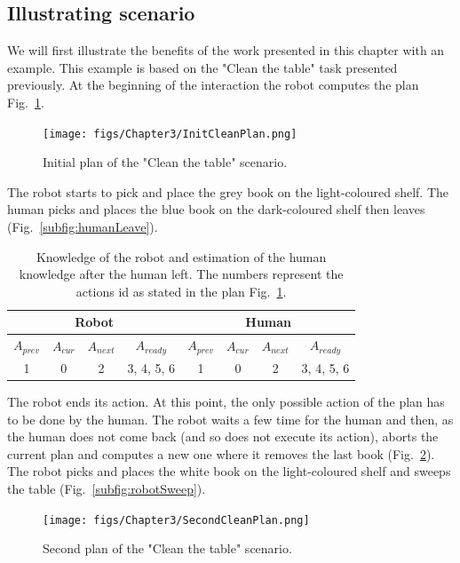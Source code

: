 \documentclass[english,a4paper,11pt,twoside]{StyleThese}
\begin{document}
\subsection{Illustrating scenario}

We will first illustrate the benefits of the work presented in this chapter with an example. This example is based on the "Clean the table" task presented previously. At the beginning of the interaction the robot computes the plan Fig.~\ref{fig:initPlanClean}. 

\begin{figure}[!h]
	\centering
    \texttt{[image: figs/Chapter3/InitCleanPlan.png]}
    \caption{Initial plan of the "Clean the table" scenario. }
    \label{fig:initPlanClean}
\end{figure}


The robot starts to pick and place the grey book on the light-coloured shelf. The human picks and places the blue book on the dark-coloured shelf then leaves (Fig.~\ref{subfig:humanLeave}).

\begin{table}[!h]
\begin{center}
\begin{tabular}{|c|c|c|c||c|c|c|c|}
\hline
\multicolumn{4}{|c||}{Robot} & \multicolumn{4}{c|}{Human}\\
\hline
$A_{prev}$ & $A_{cur}$ & $A_{next}$ & $A_{ready}$ & $A_{prev}$ & $A_{cur}$ & $A_{next}$ & $A_{ready}$\\
\hline
\hline
1 & 0 & 2 & 3, 4, 5, 6 & 1 & 0 & 2 & 3, 4, 5, 6\\
\hline
\end{tabular}
\end{center}
\caption{Knowledge of the robot and estimation of the human knowledge after the human left. The numbers represent the actions id as stated in the plan Fig.~\ref{fig:initPlanClean}.}
\label{table:results}
\end{table}

The robot ends its action. At this point, the only possible action of the plan has to be done by the human. The robot waits a few time for the human and then, as the human does not come back (and so does not execute its action), aborts the current plan and computes a new one where it removes the last book (Fig.~\ref{fig:newplan}).
The robot picks and places the white book on the light-coloured shelf and sweeps the table (Fig.~\ref{subfig:robotSweep}).

\begin{figure}[!h]
	\centering
    \texttt{[image: figs/Chapter3/SecondCleanPlan.png]}
    \caption{Second plan of the "Clean the table" scenario.}
    \label{fig:newplan}
\end{figure}
\end{document}
